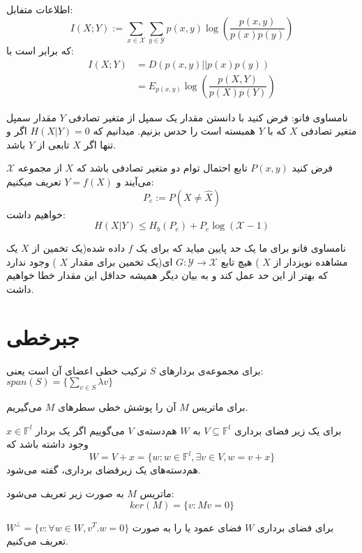 \begin{definition}
اطلاعات متفابل:
$$I(X; Y) := \sum_{x \in \mathcal{X}} \sum_{y \in \mathcal{Y}} p(x, y) \log(\dfrac{p(x, y)}{p(x)p(y)})$$
که برابر است با:
\begin{align*}
    I(X;Y) &= D(p(x, y) || p(x)p(y))
    \\
    &= E_{p(x, y)} \log(\dfrac{p(X, Y)}{p(X)p(Y)})
\end{align*}
\end{definition}
نامساوی فانو: فرض کنید با دانستن مقدار یک سمپل از متغیر تصادفی
$Y$
مقدار سمپل متغیر تصادفی
$X$
که با
$Y$
همبسته است را حدس بزنیم. میدانیم که
$H(X|Y) = 0$
اگر و تنها اگر
$X$
تابعی از
$Y$
باشد. 
\begin{theorem}[
	فانو
	]
فرض کنید
$P(x, y)$
تابع احتمال توام دو متغیر تصادفی باشد که
$X$
از مجموعه
$\mathcal{X}$
می‌آیند و
$Y = f(X)$
تعریف میکنیم:
$$P_e := P(X \neq \hat{X})$$
خواهیم داشت:
$$H(X|Y) \leq H_b(P_e) + P_e \log(\mathcal{X} - 1)$$
\end{theorem}
\begin{remark}
نامساوی فانو برای ما یک حد پایین میاید که برای یک
$f$
داده شده(یک تخمین از
$X$
 یک مشاهده نویزدار از
$X$
) هیچ تابع
$G:\mathcal{Y} \rightarrow \mathcal{X}$
ای(یک تخمین برای مقدار
$X$
) وجود ندارد که بهتر از این حد عمل کند و به بیان دیگر همیشه حداقل این مقدار خطا خواهیم داشت.
\end{remark}
\section{جبرخطی}
\begin{definition}
	برای مجموعه‌ی بردار‌های
	$S$
	ترکیب خطی اعضای آن است یعنی:
	$span(S) = \{ \sum\limits_{v \in S} \lambda v\}$
	
	برای ماتریس
	$M$
آن را پوشش خطی سطرهای 
$M$
می‌گیریم.
\end{definition}

\begin{definition}[
	همدسته
	]
	برای یک زیر فضای برداری
	$V \subseteq \mathbb{F}^l$
	به
	$W$
	هم‌دسته‌‌‌ی
	$V$
	می‌گوییم اگر یک بردار
	$x \in \mathbb{F}^l$
	وجود داشته باشد که
	$$W = V + x = \{w: w \in \mathbb{F}^l, \exists v \in V, w = v + x\}$$
	هم‌دسته‌های یک زیرفضای برداری،
	گفته می‌شود.
\end{definition}
\begin{definition}[
	هسته
	]
	ماتریس
	$M$
	به صورت زیر تعریف می‌شود:
	$$ker(M) = \{v: Mv = 0\}$$
\end{definition}
برای فضای برداری
$W$
فضای عمود یا
 را به صورت
$W^\bot = \{v: \forall w \in W, v^T.w = 0\}$
تعریف می‌کنیم.

